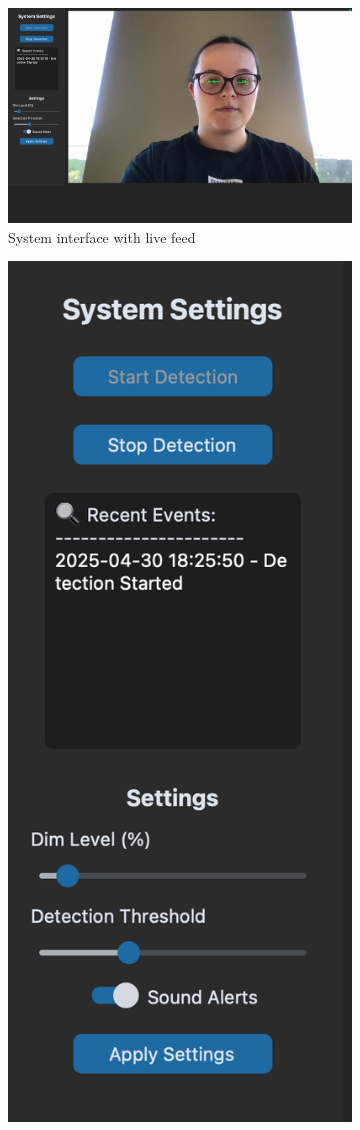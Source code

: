 \documentclass[12pt]{article}
\theoremstyle{plain}
\theoremstyle{definition}
\begin{document}
\begin{figure}
  \centering
  \begin{subfigure}[b]{0.45\textwidth}
    \centering
    \includegraphics[width=\linewidth]{img/gui.png}
    \caption{System interface with live feed}
    \label{fig:gui_face}
  \end{subfigure}
  \hfill
  \begin{subfigure}[c]{0.45\textwidth}
    \centering
    \includegraphics[width=0.6\linewidth]{img/sidebar.png}

\end{subfigure}
\end{figure}
\end{document}
